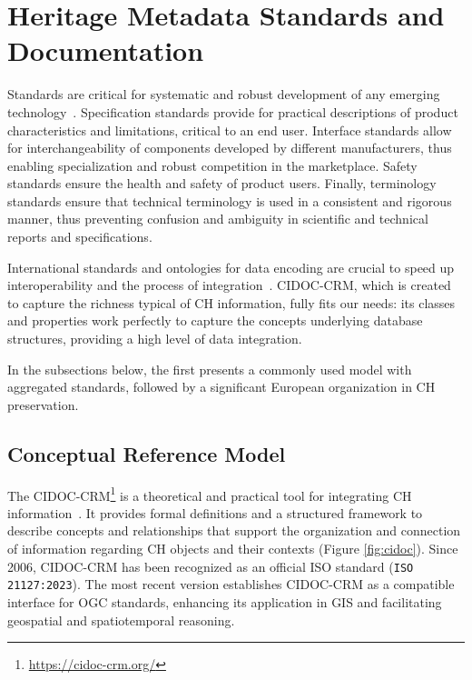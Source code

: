 \section{Heritage Metadata Standards and Documentation} 
\label{sub:standart}

Standards are critical for systematic and robust development of any emerging technology~\cite{hale2014handbook}.
Specification standards provide for practical descriptions of product characteristics and limitations, 
critical to an end user. Interface standards allow for interchangeability of components developed by 
different manufacturers, thus enabling specialization and robust competition in the marketplace. 
Safety standards ensure the health and safety of product users. Finally, terminology standards ensure that 
technical terminology is used in a consistent and rigorous manner, thus preventing confusion and 
ambiguity in scientific and technical reports and specifications.

International standards and ontologies for data encoding are crucial
to speed up interoperability and the process of integration~\cite{eide2008encoding}. \gls{CIDOC-CRM}, which is created to capture the richness typical of CH
information, fully fits our needs: its classes and properties
work perfectly to capture the concepts underlying database structures, providing a high level of data integration.

In the subsections below, the first presents a commonly used model with aggregated standards, followed by a significant European organization in \gls{CH} preservation.

\subsection{ Conceptual Reference Model} 
\label{sec:cidoc}


The \gls{CIDOC-CRM}\footnote{\url{https://cidoc-crm.org/}} is a theoretical and practical tool for integrating \gls{CH} information~\cite{eide2008encoding}. It provides formal definitions and a structured framework to describe concepts and relationships that support the organization and connection of information regarding \gls{CH} objects and their contexts (Figure \ref{fig:cidoc}).
Since 2006, \gls{CIDOC-CRM} has been recognized as an official ISO standard (\texttt{ISO 21127:2023}). The most recent version establishes \gls{CIDOC-CRM} as a compatible interface for \gls{OGC} standards, enhancing its application in \gls{GIS} and facilitating geospatial and spatiotemporal reasoning.


